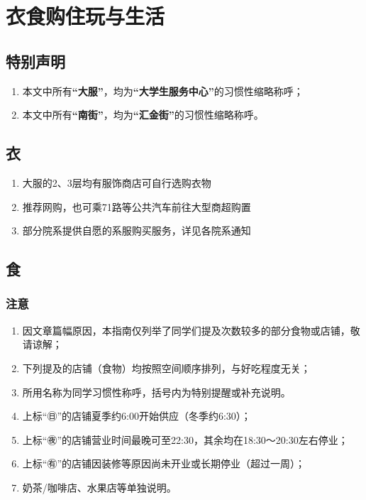 \section[衣食购住玩与生活]{衣食购住玩与生活}

\subsection*{特别声明}
\begin{enumerate}
    \item 本文中所有\textbf{“大服”}，均为\textbf{“大学生服务中心”}的习惯性缩略称呼；
    \item 本文中所有\textbf{“南街”}，均为\textbf{“汇金街”}的习惯性缩略称呼。
\end{enumerate}
\subsection[衣]{衣}
\begin{enumerate}
    \item 大服的2、3层均有服饰商店可自行选购衣物
    \item 推荐网购，也可乘71路等公共汽车前往大型商超购置
    \item 部分院系提供自愿的系服购买服务，详见各院系通知
\end{enumerate}

\subsection[食]{食}
\subsubsection*{注意}
\begin{enumerate}
    \item 因文章篇幅原因，本指南仅列举了同学们提及次数较多的部分食物或店铺，敬请谅解；
    \item 下列提及的店铺（食物）均按照空间顺序排列，与好吃程度无关；
    \item 所用名称为同学习惯性称呼，括号内为特别提醒或补充说明。
    \item 上标“㊐”的店铺夏季约6:00开始供应（冬季约6:30）；
    \item 上标“㊰”的店铺营业时间最晚可至22:30，其余均在18:30～20:30左右停业；
    \item 上标“㊒”的店铺因装修等原因尚未开业或长期停业（超过一周）；
    \item 奶茶/咖啡店、水果店等单独说明。
\end{enumerate}

